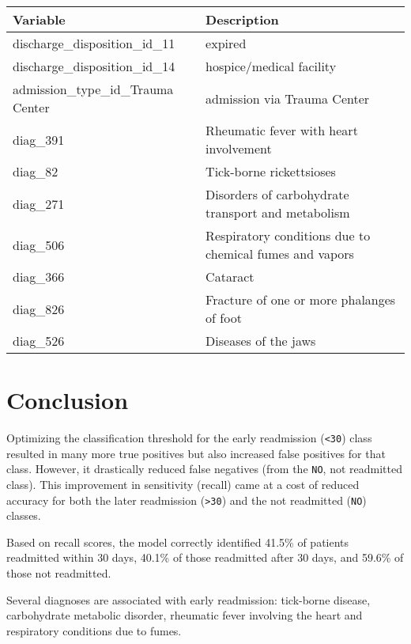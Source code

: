\documentclass{article}      %
\begin{document}
\begin{table}[h!]
    \centering
    \begin{tabular}{|l|p{9cm}|}
    \hline
    \textbf{Variable} & \textbf{Description} \\ \hline \hline
    discharge\_disposition\_id\_11 & expired \\ \hline
    discharge\_disposition\_id\_14 & hospice/medical facility \\ \hline
    admission\_type\_id\_Trauma Center & admission via Trauma Center \\ \hline
    diag\_391 & Rheumatic fever with heart involvement \\ \hline
    diag\_82 & Tick-borne rickettsioses \\ \hline
    diag\_271 & Disorders of carbohydrate transport and metabolism \\ \hline
    diag\_506 & Respiratory conditions due to chemical fumes and vapors \\ \hline
    diag\_366 & Cataract \\ \hline
    diag\_826 & Fracture of one or more phalanges of foot \\ \hline
    diag\_526 & Diseases of the jaws \\ \hline
    \end{tabular}
    \label{table:important_variables}
\end{table}

\section{Conclusion}

Optimizing the classification threshold for the early readmission (\texttt{\textless30}) class resulted in many more true positives but also increased false positives for that class. However, it drastically reduced false negatives (from the \texttt{NO}, not readmitted class). This improvement in sensitivity (recall) came at a cost of reduced accuracy for both the later readmission (\texttt{\textgreater 30}) and the not readmitted (\texttt{NO}) classes.

Based on recall scores, the model correctly identified 41.5\% of patients readmitted within 30 days, 40.1\% of those readmitted after 30 days, and 59.6\% of those not readmitted.

Several diagnoses are associated with early readmission: tick-borne disease, carbohydrate metabolic disorder, rheumatic fever involving the heart and respiratory conditions due to fumes. 
\end{document}
